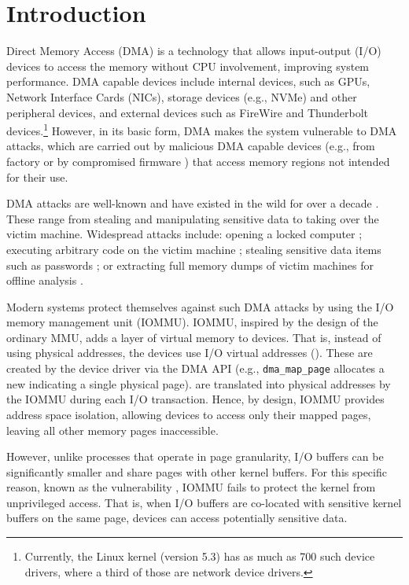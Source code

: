 \section{Introduction}

Direct Memory Access (DMA) is a technology that allows input-output (I/O) devices to access the memory without CPU involvement, improving system performance.
DMA capable devices include internal devices, such as GPUs, Network Interface Cards (NICs), storage devices (e.g., NVMe) and other peripheral devices, and external devices such as FireWire and Thunderbolt devices.\footnote{Currently, the Linux kernel (version 5.3) has as much as 700 such device drivers, where a third of those are network device drivers.} However, in its basic form, DMA makes the system vulnerable to DMA attacks, which are carried out by malicious DMA capable devices (e.g., from factory or by compromised firmware \cite{Gal14,Ben17a}) that access memory regions not intended for their use. 


DMA attacks are well-known and have existed in the wild for over a decade \cite{Dor04,BDK10,thunder}. These range from stealing and manipulating sensitive data to taking over the victim machine. Widespread attacks include: opening a locked computer \cite{MM, Fin14}; executing arbitrary code on the victim machine \cite{Fri16, Woj08, AD10,thunder}; stealing sensitive data items such as passwords \cite{SB12, LKV13, Cim16, BR12}; or extracting full memory dumps of victim machines for offline analysis \cite{MM, Vol, Fin14, GA10}. 

Modern systems protect themselves against such DMA attacks by using the I/O memory management unit (IOMMU). IOMMU, inspired by the design of the ordinary MMU, adds a layer of virtual memory to devices. That is, instead of using physical addresses, the devices use I/O virtual addresses (\iova). These \iova{} are created by the device driver via the DMA API (e.g., \texttt{dma\_map\_page} allocates a new \iova{} indicating a single physical page). \iova{} are translated into physical addresses by the IOMMU during each I/O transaction. Hence, by design, IOMMU provides address space isolation, allowing devices to access only their mapped pages, leaving all other memory pages inaccessible. 

However, unlike processes that operate in page granularity, I/O buffers can be significantly smaller and share pages with other kernel buffers. For this specific reason, known as the \subpage{} vulnerability \cite{MMT16,thunder}, IOMMU fails to protect the kernel from unprivileged access. That is, when I/O buffers are co-located with sensitive kernel buffers on the same page, devices can access potentially sensitive data. 


